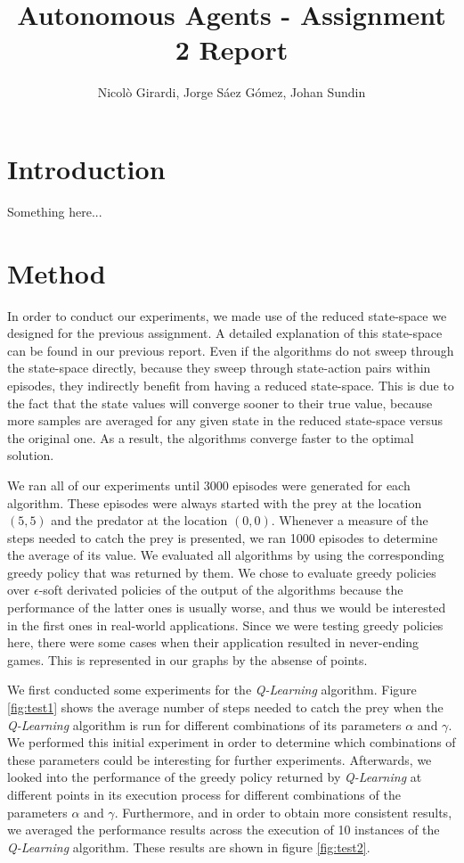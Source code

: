 \documentclass[a4paper,10pt]{article}
\title{Autonomous Agents - Assignment 2 Report}
\author{Nicolò Girardi, Jorge Sáez Gómez, Johan Sundin}
\begin{document}
\maketitle

\section{Introduction}

Something here...

\section{Method}

In order to conduct our experiments, we made use of the reduced state-space we designed for the previous assignment. A detailed explanation of this state-space can be found in our previous report. Even if the algorithms do not sweep through the state-space directly, because they sweep through state-action pairs within episodes, they indirectly benefit from having a reduced state-space. This is due to the fact that the state values will converge sooner to their true value, because more samples are averaged for any given state in the reduced state-space versus the original one. As a result, the algorithms converge faster to the optimal solution.

We ran all of our experiments until 3000 episodes were generated for each algorithm. These episodes were always started with the prey at the location $(5, 5)$ and the predator at the location $(0, 0)$. Whenever a measure of the steps needed to catch the prey is presented, we ran 1000 episodes to determine the average of its value. We evaluated all algorithms by using the corresponding greedy policy that was returned by them. We chose to evaluate greedy policies over $\epsilon$-soft derivated policies of the output of the algorithms because the performance of the latter ones is usually worse, and thus we would be interested in the first ones in real-world applications. Since we were testing greedy policies here, there were some cases when their application resulted in never-ending games. This is represented in our graphs by the absense of points.

We first conducted some experiments for the \textit{Q-Learning} algorithm. Figure \ref{fig:test1} shows the average number of steps needed to catch the prey when the \textit{Q-Learning} algorithm is run for different combinations of its parameters $\alpha$ and $\gamma$. We performed this initial experiment in order to determine which combinations of these parameters could be interesting for further experiments. Afterwards, we looked into the performance of the greedy policy returned by \textit{Q-Learning} at different points in its execution process for different combinations of the parameters $\alpha$ and $\gamma$. Furthermore, and in order to obtain more consistent results, we averaged the performance results across the execution of 10 instances of the \textit{Q-Learning} algorithm. These results are shown in figure \ref{fig:test2}.
\end{document}
